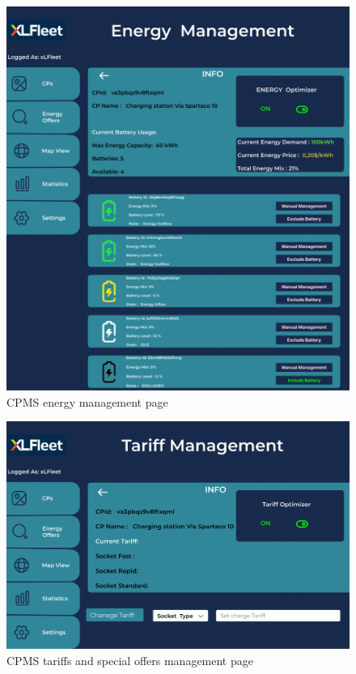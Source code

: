 \documentclass{Configuration_Files/PoliMi3i_thesis}
\begin{document}
\begin{figure}[H]
    \centering
    \includegraphics[width=1\textwidth]{Images/user-interface/cpms/CPMS-8.png}
    \caption{CPMS energy management page}
\end{figure}

\begin{figure}[H]
    \centering
    \includegraphics[width=1\textwidth]{Images/user-interface/cpms/CPMS-9.png}
    \caption{CPMS tariffs and special offers management page}
\end{figure}
\end{document}
